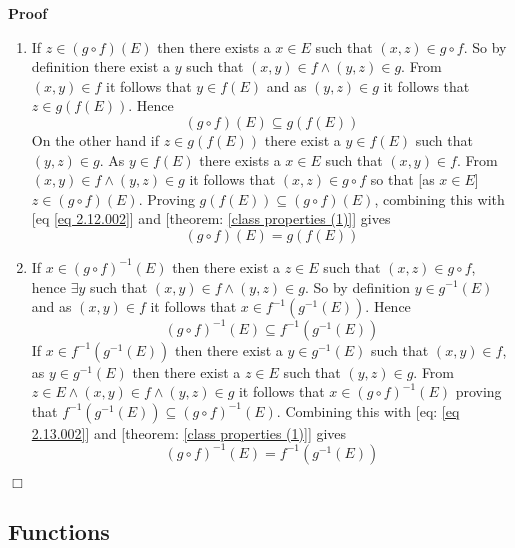 \documentclass{book}
\newenvironment{proof}{\noindent\textbf{Proof\ }}{\hspace*{\fill}$\Box$\medskip}
\begin{document}
\begin{proof}
  
  \begin{enumerate}
    \item If $z \in (g \circ f) (E)$ then there exists a $x \in E$ such that
    $(x, z) \in g \circ f$. So by definition there exist a $y$ such that $(x,
    y) \in f \wedge (y, z) \in g$. From $(x, y) \in f$ it follows that $y \in
    f (E)$ and as $(y, z) \in g$ it follows that $z \in g (f (E))$. Hence
    \begin{equation}
      \label{eq 2.12.002} (g \circ f) (E) \subseteq g (f (E))
    \end{equation}
    On the other hand if $z \in g (f (E))$ there exist a $y \in f (E)$ such
    that $(y, z) \in g$. As $y \in f (E)$ there exists a $x \in E$ such that
    $(x, y) \in f$. From $(x, y) \in f \wedge (y, z) \in g$ it follows that
    $(x, z) \in g \circ f$ so that [as $x \in E$] $z \in (g \circ f) (E)$.
    Proving $g (f (E)) \subseteq (g \circ f) (E)$, combining this with [eq
    \ref{eq 2.12.002}] and [theorem: \ref{class properties (1)}] gives
    \[ (g \circ f) (E) = g (f (E)) \]
    \item If $x \in (g \circ f)^{- 1} (E)$ then there exist a $z \in E$ such
    that $(x, z) \in g \circ f$, hence $\exists y$ such that $(x, y) \in f
    \wedge (y, z) \in g$. So by definition $y \in g^{- 1} (E)$ and as $(x, y)
    \in f$ it follows that $x \in f^{- 1} (g^{- 1} (E))$. Hence
    \begin{equation}
      \label{eq 2.13.002} (g \circ f)^{- 1} (E) \subseteq f^{- 1} (g^{- 1}
      (E))
    \end{equation}
    If $x \in f^{- 1} (g^{- 1} (E))$ then there exist a $y \in g^{- 1} (E)$
    such that $(x, y) \in f$, as $y \in g^{- 1} (E)$ then there exist a $z \in
    E$ such that $(y, z) \in g$. From $z \in E \wedge (x, y) \in f \wedge (y,
    z) \in g$ it follows that $x \in (g \circ f)^{- 1} (E)$ proving that $f^{-
    1} (g^{- 1} (E)) \subseteq (g \circ f)^{- 1} (E)$. Combining this with
    [eq: \ref{eq 2.13.002}] and [theorem: \ref{class properties (1)}] gives
    \[ (g \circ f)^{- 1} (E) = f^{- 1} (g^{- 1} (E)) \]
  \end{enumerate}
\end{proof}

\subsection{Functions}
\end{document}
